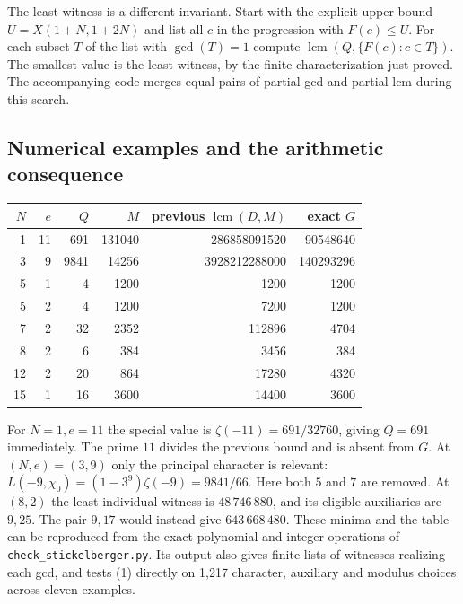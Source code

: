The least witness is a different invariant. Start with the explicit upper
bound $U=X(1+N,1+2N)$ and list all $c$ in the progression with $F(c)\le U$.
For each subset $T$ of the list with $\gcd(T)=1$ compute
$\operatorname{lcm}(Q,\{F(c):c\in T\})$. The smallest value is the least
witness, by the finite characterization just proved. The accompanying
code merges equal pairs of partial gcd and partial lcm during this search.

\subsection{Numerical examples and the arithmetic consequence}

\begin{center}
\small
\begin{tabular}{r r r r r r}
\hline
$N$ & $e$ & $Q$ & $M$ & previous $\operatorname{lcm}(D,M)$ & exact $G$\\
\hline
1&11&691&131040&286858091520&90548640\\
3&9&9841&14256&3928212288000&140293296\\
5&1&4&1200&1200&1200\\
5&2&4&1200&7200&1200\\
7&2&32&2352&112896&4704\\
8&2&6&384&3456&384\\
12&2&20&864&17280&4320\\
15&1&16&3600&14400&3600\\
\hline
\end{tabular}
\end{center}

For $N=1,e=11$ the special value is $\zeta(-11)=691/32760$, giving
$Q=691$ immediately. The prime $11$ divides the previous bound and is
absent from $G$. At $(N,e)=(3,9)$ only the principal character is relevant:
$L(-9,\chi_0)=(1-3^9)\zeta(-9)=9841/66$. Here both $5$ and $7$
are removed. At $(8,2)$ the least individual witness is $48\,746\,880$,
and its eligible auxiliaries are $9,25$. The pair $9,17$ would instead
give $643\,668\,480$. These minima and the table can be reproduced from
the exact polynomial and integer operations of
\texttt{check\_stickelberger.py}. Its output also gives finite lists of
witnesses realizing each gcd, and tests (1) directly on 1,217
character, auxiliary and modulus choices across eleven examples.

